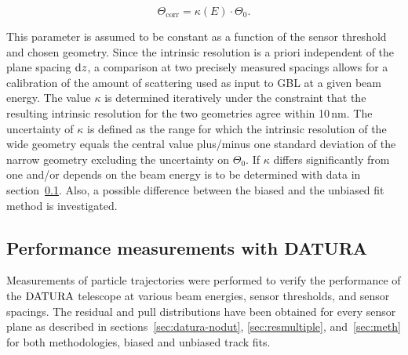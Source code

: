 \begin{equation}
 \Theta_{\textrm{corr}} = \kappa(E) \cdot \Theta_0.
 \label{eq:thetacorr}
\end{equation}

\noindent
This parameter is assumed to be constant as a function of the sensor threshold and chosen geometry. 
Since the intrinsic resolution is a priori independent of the plane spacing $\textrm{d}z$,
 a comparison at two precisely measured spacings allows for a calibration of the amount of scattering used as input to GBL at a given beam energy. 
The value $\kappa$ is determined iteratively under the constraint that the resulting intrinsic resolution for the two geometries agree within 10\,nm.
The uncertainty of $\kappa$ is defined as the range for which the intrinsic resolution of the wide geometry equals the central value plus/minus one standard deviation of the narrow geometry
 excluding the uncertainty on $\Theta_0$. 
If $\kappa$ differs significantly from one and/or depends on the beam energy is to be determined with data in section~\ref{sec:measurements}. 
Also, a possible difference between the biased and the unbiased fit method is investigated. 


\subsection{Performance measurements with DATURA}
\label{sec:measurements}

Measurements of particle trajectories were performed to verify the performance of the $\textrm{DATURA}$ telescope at various beam energies, sensor thresholds, and sensor spacings. %
The residual and pull distributions have been obtained for every sensor plane as described in sections~\ref{sec:datura-nodut}, \ref{sec:resmultiple}, and~\ref{sec:meth}
 for both methodologies, biased and unbiased track fits. 
% 



